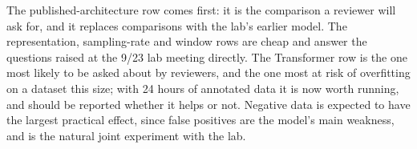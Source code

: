 The published-architecture row comes first: it is the comparison a reviewer
will ask for, and it replaces comparisons with the lab's earlier model. The
representation, sampling-rate and window rows are cheap and answer the
questions raised at the 9/23 lab meeting directly. The Transformer row is the one most likely to be
asked about by reviewers, and the one most at risk of overfitting on a
dataset this size; with 24 hours of annotated data it is now worth running, and
should be reported whether it helps or not. Negative
data is expected to have the largest practical effect, since false
positives are the model's main weakness, and is the natural joint
experiment with the lab.
